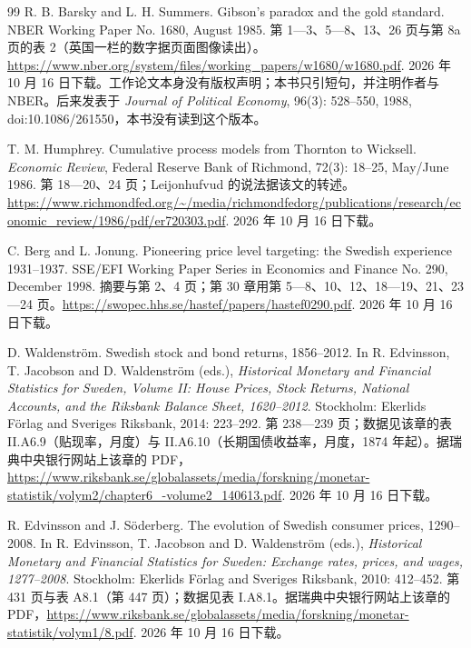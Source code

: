 \begin{thebibliography}{99}
 R. B. Barsky and L. H. Summers. Gibson's paradox and the gold standard. NBER Working Paper No. 1680, August 1985. 第 1—3、5—8、13、26 页与第 8a 页的表 2（英国一栏的数字据页面图像读出）。\url{https://www.nber.org/system/files/working_papers/w1680/w1680.pdf}. 2026 年 10 月 16 日下载。工作论文本身没有版权声明；本书只引短句，并注明作者与 NBER。后来发表于 \emph{Journal of Political Economy}, 96(3): 528--550, 1988, doi:10.1086/261550，本书没有读到这个版本。

 T. M. Humphrey. Cumulative process models from Thornton to Wicksell. \emph{Economic Review}, Federal Reserve Bank of Richmond, 72(3): 18--25, May/June 1986. 第 18—20、24 页；Leijonhufvud 的说法据该文的转述。\url{https://www.richmondfed.org/~/media/richmondfedorg/publications/research/economic_review/1986/pdf/er720303.pdf}. 2026 年 10 月 16 日下载。

 C. Berg and L. Jonung. Pioneering price level targeting: the Swedish experience 1931--1937. SSE/EFI Working Paper Series in Economics and Finance No. 290, December 1998. 摘要与第 2、4 页；第 30 章用第 5—8、10、12、18—19、21、23—24 页。\url{https://swopec.hhs.se/hastef/papers/hastef0290.pdf}. 2026 年 10 月 16 日下载。

 D. Waldenström. Swedish stock and bond returns, 1856--2012. In R. Edvinsson, T. Jacobson and D. Waldenström (eds.), \emph{Historical Monetary and Financial Statistics for Sweden, Volume II: House Prices, Stock Returns, National Accounts, and the Riksbank Balance Sheet, 1620--2012}. Stockholm: Ekerlids Förlag and Sveriges Riksbank, 2014: 223--292. 第 238—239 页；数据见该章的表 II.A6.9（贴现率，月度）与 II.A6.10（长期国债收益率，月度，1874 年起）。据瑞典中央银行网站上该章的 PDF，\url{https://www.riksbank.se/globalassets/media/forskning/monetar-statistik/volym2/chapter6_-volume2_140613.pdf}. 2026 年 10 月 16 日下载。

 R. Edvinsson and J. Söderberg. The evolution of Swedish consumer prices, 1290--2008. In R. Edvinsson, T. Jacobson and D. Waldenström (eds.), \emph{Historical Monetary and Financial Statistics for Sweden: Exchange rates, prices, and wages, 1277--2008}. Stockholm: Ekerlids Förlag and Sveriges Riksbank, 2010: 412--452. 第 431 页与表 A8.1（第 447 页）；数据见表 I.A8.1。据瑞典中央银行网站上该章的 PDF，\url{https://www.riksbank.se/globalassets/media/forskning/monetar-statistik/volym1/8.pdf}. 2026 年 10 月 16 日下载。


\end{thebibliography}
